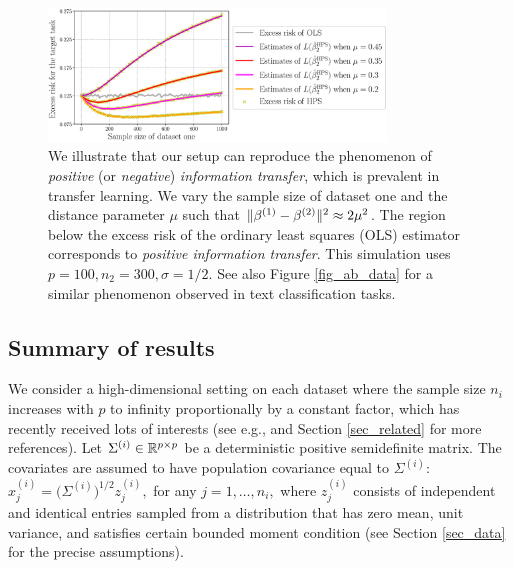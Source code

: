 \begin{figure}
    \centering
    \includegraphics[width=0.8\textwidth]{figures/motivation.eps}
    \caption{We illustrate that our setup can reproduce the phenomenon of \textit{positive} (or \textit{negative}) \textit{information transfer}, which is prevalent in transfer learning.
    We vary the sample size of dataset one and the distance parameter $\mu$ such that $\|\beta^{(1)} - \beta^{(2)}\|^2 \approx 2\mu^2$. The region below the excess risk of the ordinary least squares (OLS) estimator corresponds to \textit{positive information transfer}. This simulation uses $p = 100, n_2 = 300, \sigma = 1/2$. See also Figure \ref{fig_ab_data} for a similar phenomenon observed in text classification tasks.}
    \label{fig_motivation}
\end{figure}

\subsection{Summary of results}

We consider a high-dimensional setting on each dataset where the sample size $n_i$ increases with $p$ to infinity proportionally by a constant factor, which has recently received lots of interests (see e.g., \citet{hastie2019surprises} and Section \ref{sec_related} for more references).
Let $\Sigma^{(i)} \in \mathbb{R}^{p\times p}$ be a deterministic positive semidefinite matrix.
The covariates are assumed to have population covariance equal to $\Sigma^{(i)}$: $x_j^{(i)} = \big(\Sigma^{(i)}\big)^{1/2} z_{j}^{(i)},$ for any $j = 1,\dots,n_i,$
where $z_j^{(i)}$ consists of independent and identical entries sampled from a distribution that has zero mean, unit variance, and satisfies certain bounded moment condition (see Section \ref{sec_data} for the precise assumptions).

